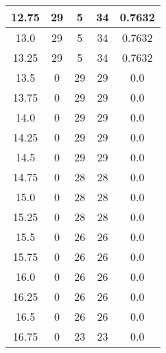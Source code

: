 \documentclass[letterpaper, 12pt]{article}
\begin{document}
\begin{longtable}{|c|c|c|c|c|}
\hline
12.75 & 29 & 5 & 34 & 0.7632 \\
\hline
13.0 & 29 & 5 & 34 & 0.7632 \\
\hline
13.25 & 29 & 5 & 34 & 0.7632 \\
\hline
13.5 & 0 & 29 & 29 & 0.0 \\
\hline
13.75 & 0 & 29 & 29 & 0.0 \\
\hline
14.0 & 0 & 29 & 29 & 0.0 \\
\hline
14.25 & 0 & 29 & 29 & 0.0 \\
\hline
14.5 & 0 & 29 & 29 & 0.0 \\
\hline
14.75 & 0 & 28 & 28 & 0.0 \\
\hline
15.0 & 0 & 28 & 28 & 0.0 \\
\hline
15.25 & 0 & 28 & 28 & 0.0 \\
\hline
15.5 & 0 & 26 & 26 & 0.0 \\
\hline
15.75 & 0 & 26 & 26 & 0.0 \\
\hline
16.0 & 0 & 26 & 26 & 0.0 \\
\hline
16.25 & 0 & 26 & 26 & 0.0 \\
\hline
16.5 & 0 & 26 & 26 & 0.0 \\
\hline
16.75 & 0 & 23 & 23 & 0.0 \\
\hline
\end{longtable}
\end{document}

